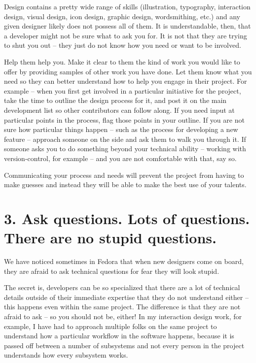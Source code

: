 Design contains a pretty wide range of skills (illustration, typography,
interaction design, visual design, icon design, graphic design, wordsmithing,
etc.) and any given designer likely does not possess all of them. It is
understandable, then, that a developer might not be sure what to ask you for.
It is not that they are trying to shut you out -- they just do not know how you
need or want to be involved.

Help them help you. Make it clear to them the kind of work you would like to offer by providing samples of other work you have done. Let them know what you need so they can better understand how to help you engage in their project. For example -- when you first get involved in a particular initiative for the project, take the time to outline the design process for it, and post it on the main development list so other contributors can follow along. If you need input at particular points in the process, flag those points in your outline. If you are not sure how particular things happen -- such as the process for developing a new feature -- approach someone on the side and ask them to walk you through it. If someone asks you to do something beyond your technical ability -- working with version-control, for example -- and you are not comfortable with that, say so.

Communicating your process and needs will prevent the project from having to
make guesses and instead they will be able to make the best use of your talents.

\section*{3. Ask questions. Lots of questions. There are no stupid questions.}

We have noticed sometimes in Fedora that when new designers come on board, they
are afraid to ask technical questions for fear they will look stupid. 

The secret is, developers can be so specialized that there are a lot of
technical details outside of their immediate expertise that they do not
understand either -- this happens even within the same project. The difference is that they are not afraid to ask -- so you should not be, either! In my interaction design work, for example, I have had to approach multiple folks on the same project to understand how a particular workflow in the software happens, because it is passed off between a number of subsystems and not every person in the project understands how every subsystem works. 

